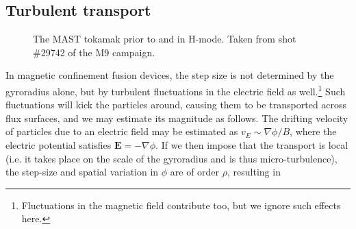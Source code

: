 \subsection*{Turbulent transport}
\begin{figure}[!b]
  \centering
  \hfill
  \caption{The MAST tokamak prior to and in H-mode. Taken from shot \#29742 of the M9 campaign.}
  \label{fig: L-H mode in MAST}
\end{figure}
In magnetic confinement fusion devices, the step size is not determined by the gyroradius alone, but by turbulent fluctuations in the electric field as well.\footnote{Fluctuations in the magnetic field contribute too, but we ignore such effects here.} Such fluctuations will kick the particles around, causing them to be transported across flux surfaces, and we may estimate its magnitude as follows. The drifting velocity of particles due to an electric field may be estimated as $v_E \sim \nabla \phi/B$, where the electric potential satisfies $\boldsymbol{E} = - \nabla \phi$. If we then impose that the transport is local (i.e. it takes place on the scale of the gyroradius and is thus micro-turbulence), the step-size and spatial variation in $\phi$ are of order $\rho$, resulting in
